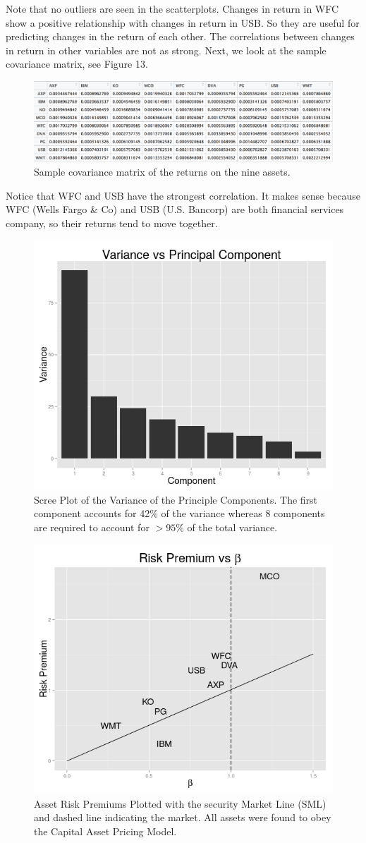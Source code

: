 \documentclass[10pt]{article_simple}
\begin{document}
Note that no outliers are seen in the scatterplots. Changes in return in WFC show a positive
relationship with changes in return in USB. So they are useful for predicting changes in the
return of each other. The correlations between changes in return in other variables are not as
strong. Next, we look at the sample covariance matrix, see Figure 13.

\begin{figure}[H]
	\centering
  	\includegraphics[width=.85\linewidth]{covariance_matrix}
  	\centering
  	\caption{Sample covariance matrix of the returns on the nine assets.}
\end{figure}

Notice that WFC and USB have the strongest correlation. It makes sense because WFC (Wells
Fargo \& Co) and USB (U.S. Bancorp) are both financial services company, so their returns tend
to move together.

\begin{figure}[H]
	\centering
  	\includegraphics[width=.55\linewidth]{PCA}
  	\centering
  	\caption{Scree Plot of the Variance of the Principle Components. The first component accounts for 42\% of the variance whereas 8 components are required to account for $>95\%$ of the total variance.}
\end{figure}


\begin{figure}[H]
	\centering
  	\includegraphics[width=.55\linewidth]{Risk_Premium_vs_Beta}
  	\centering
  	\caption{Asset Risk Premiums Plotted with the security Market Line (SML) and dashed line indicating the market. All assets were found to obey the Capital Asset Pricing Model.}
\end{figure}
\end{document}
